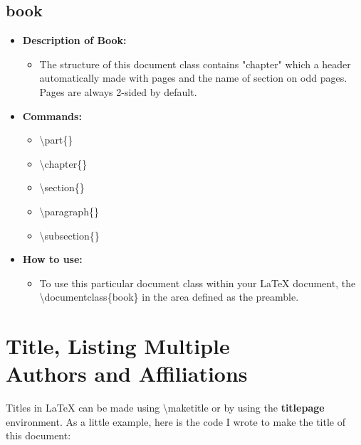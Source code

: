 \subsection{book}
\begin{itemize}
   \item \textbf{Description of Book:}
      \begin{itemize}
      \item The structure of this document class
      contains "chapter" which a header 
      automatically made with pages and the name
      of section on odd pages. Pages are always
      2-sided by default.  
      \end{itemize}
   \item \textbf{Commands:}
      \begin{itemize}[label={}]
      \item \textbackslash{part\{\}}
      \item \textbackslash{chapter\{\}}
      \item \textbackslash{section\{\}}
      \item \textbackslash{paragraph\{\}} ~\cite{latex_wikia}
      \item \textbackslash{subsection\{\}}  
      \end{itemize}
   \item \textbf{How to use:}
      \begin{itemize}
      \item To use this particular document class within your \LaTeX{} 
       document, the \textbackslash{documentclass\{book\}} in the area
       defined as the preamble.
      \end{itemize}
\end{itemize}


\section{Title, Listing Multiple \\ Authors and Affiliations}

Titles in \LaTeX{} can be made using \textbackslash{maketitle} or
by using the \textbf{titlepage} environment. As a little example,
here is the code I wrote to make the title of this document:\\

